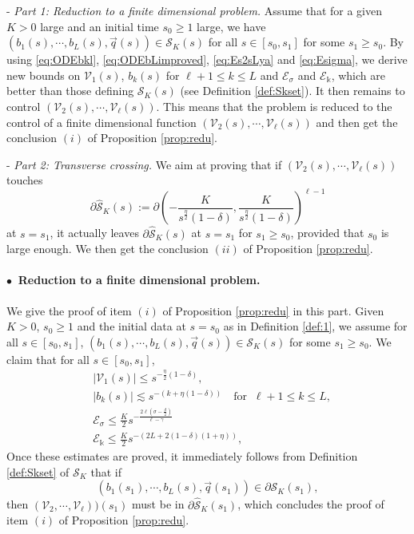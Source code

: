 \documentclass[11pt]{aims}
\theoremstyle{definition}
\numberwithin{equation}{section}
\begin{document}
- \textit{Part 1: Reduction to a finite dimensional problem.} Assume that for a given $K > 0$ large and an initial time $s_0 \geq 1$ large, we have $(b_1(s), \cdots, b_L(s), \vec q(s)) \in {\mathcal{S}}_K(s)$ for all $s \in [s_0, s_1]$ for some $s_1 \geq s_0$. By using \eqref{eq:ODEbkl}, \eqref{eq:ODEbLimproved}, \eqref{eq:Es2sLya} and \eqref{eq:Esigma}, we derive new bounds on ${\mathcal{V}}_1(s)$, $b_k(s)$ for $\ell + 1 \leq k \leq L$ and ${\mathscr{E}}_\sigma$ and ${\mathscr{E}}_\Bbbk$, which are better than those defining ${\mathcal{S}}_K(s)$ (see Definition \ref{def:Skset}). It then remains to control $({\mathcal{V}}_2(s), \cdots, {\mathcal{V}}_\ell(s))$. This means that the problem is reduced to the control of a finite dimensional function $({\mathcal{V}}_2(s), \cdots, {\mathcal{V}}_\ell(s))$ and then get the conclusion $(i)$ of Proposition \ref{prop:redu}.

- \textit{Part 2: Transverse crossing.} We aim at proving that if $({\mathcal{V}}_2(s), \cdots, {\mathcal{V}}_\ell(s))$ touches 
$$\partial \hat {\mathcal{S}} _K(s):= \partial\left(-\frac{K}{s^{\frac{\eta}{2}}(1 - \delta)}, \frac{K}{s^{\frac{\eta}{2}}(1 - \delta)}\right)^{\ell - 1}$$
at $s = s_1$, it actually leaves $\partial \hat {\mathcal{S}}_K(s)$ at $s=s_1$ for $s_1 \geq s_0$, provided that $s_0$ is large enough. We then get the conclusion $(ii)$ of Proposition \ref{prop:redu}.

\paragraph{$\bullet\,$ Reduction to a finite dimensional problem.} We give the proof of item $(i)$ of Proposition \ref{prop:redu} in this part. Given $K > 0$, $s_0 \geq 1$ and the initial data at $s = s_0$ as in Definition \ref{def:1}, we assume for all $s \in [s_0, s_1]$, $(b_1(s), \cdots, b_L(s), \vec q(s)) \in {\mathcal{S}}_K(s)$ for some $s_1 \geq s_0$. We claim that for all $s \in [s_0, s_1]$,
\begin{align}
&|{\mathcal{V}}_1(s)| \leq s^{-\frac \eta 2(1- \delta)},\label{est:impV1}\\
&|b_k(s)| \lesssim s^{-(k + \eta(1 - \delta))} \quad \text{for}\;\; \ell + 1 \leq k \leq L,\label{est:impbk}\\
&{\mathscr{E}}_\sigma \leq \frac{K}{2}s^{-\frac{2\ell(\sigma - \frac{d}{2})}{\ell - \gamma}}\label{est:impEsigma}\\
&{\mathscr{E}}_{\Bbbk} \leq \frac{K}{2} s^{-(2L + 2(1 - \delta)(1 + \eta))},\label{est:impE2k}
\end{align}
Once these estimates are proved, it immediately follows from Definition \ref{def:Skset} of ${\mathcal{S}}_K$ that if 
$$(b_1(s_1), \cdots, b_L(s), \vec q(s_1)) \in \partial{\mathcal{S}}_K(s_1),$$
then $({\mathcal{V}}_2, \cdots, {\mathcal{V}}_\ell))(s_1)$ must be in $\partial \hat {\mathcal{S}}_K(s_1)$, which concludes the proof of item $(i)$ of Proposition \ref{prop:redu}.\\
\end{document}
